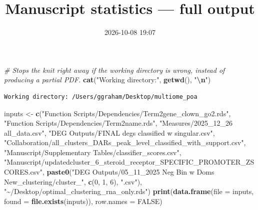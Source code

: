 \documentclass[
  landscape]{article}
\title{Manuscript statistics --- full output}
\author{}
\date{\vspace{-2.5em}2026-10-08 19:07}
\newenvironment{Shaded}{\begin{snugshade}}{\end{snugshade}}
\newcommand{\AttributeTok}[1]{\textcolor[rgb]{0.13,0.29,0.53}{#1}}
\newcommand{\CommentTok}[1]{\textcolor[rgb]{0.56,0.35,0.01}{\textit{#1}}}
\newcommand{\ConstantTok}[1]{\textcolor[rgb]{0.56,0.35,0.01}{#1}}
\newcommand{\DecValTok}[1]{\textcolor[rgb]{0.00,0.00,0.81}{#1}}
\newcommand{\FunctionTok}[1]{\textcolor[rgb]{0.13,0.29,0.53}{\textbf{#1}}}
\newcommand{\NormalTok}[1]{#1}
\newcommand{\OtherTok}[1]{\textcolor[rgb]{0.56,0.35,0.01}{#1}}
\newcommand{\SpecialCharTok}[1]{\textcolor[rgb]{0.81,0.36,0.00}{\textbf{#1}}}
\newcommand{\StringTok}[1]{\textcolor[rgb]{0.31,0.60,0.02}{#1}}
\begin{document}
\maketitle

{
\setcounter{tocdepth}{2}
\tableofcontents
}
\begin{Shaded}
\begin{Highlighting}[]
\CommentTok{\# Stops the knit right away if the working directory is wrong, instead of producing a partial PDF.}
\FunctionTok{cat}\NormalTok{(}\StringTok{"Working directory:"}\NormalTok{, }\FunctionTok{getwd}\NormalTok{(), }\StringTok{"}\SpecialCharTok{\textbackslash{}n}\StringTok{"}\NormalTok{)}
\end{Highlighting}
\end{Shaded}

\begin{verbatim}
Working directory: /Users/ggraham/Desktop/multiome_poa 
\end{verbatim}

\begin{Shaded}
\begin{Highlighting}[]
\NormalTok{inputs }\OtherTok{\textless{}{-}} \FunctionTok{c}\NormalTok{(}\StringTok{"Function Scripts/Dependencies/Term2gene\_clown\_go2.rds"}\NormalTok{,}
            \StringTok{"Function Scripts/Dependencies/Term2name.rds"}\NormalTok{,}
            \StringTok{"Measures/2025\_12\_26 all\_data.csv"}\NormalTok{,}
            \StringTok{"DEG Outputs/FINAL degs classified w singular.csv"}\NormalTok{,}
            \StringTok{"Collaboration/all\_clusters\_DARs\_peak\_level\_classified\_with\_support.csv"}\NormalTok{,}
            \StringTok{"Manuscript/Supplementary Tables/classifier\_scores.csv"}\NormalTok{,}
            \StringTok{"Manuscript/updatedcluster\_6\_steroid\_receptor\_SPECIFIC\_PROMOTER\_ZSCORES.csv"}\NormalTok{,}
            \FunctionTok{paste0}\NormalTok{(}\StringTok{"DEG Outputs/05\_11\_2025 Neg Bin w Doms New\_clustering/cluster\_"}\NormalTok{, }\FunctionTok{c}\NormalTok{(}\DecValTok{0}\NormalTok{, }\DecValTok{1}\NormalTok{, }\DecValTok{6}\NormalTok{), }\StringTok{".csv"}\NormalTok{),}
            \StringTok{"\textasciitilde{}/Desktop/optimal\_clustering\_rna\_only.rds"}\NormalTok{)}
\FunctionTok{print}\NormalTok{(}\FunctionTok{data.frame}\NormalTok{(}\AttributeTok{file =}\NormalTok{ inputs, }\AttributeTok{found =} \FunctionTok{file.exists}\NormalTok{(inputs)), }\AttributeTok{row.names =} \ConstantTok{FALSE}\NormalTok{)}
\end{Highlighting}
\end{Shaded}
\end{document}
